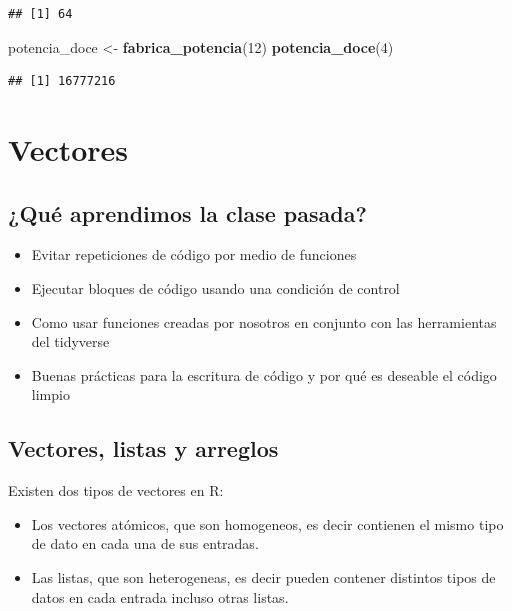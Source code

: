 \documentclass[]{book}
\newenvironment{Shaded}{\begin{snugshade}}{\end{snugshade}}
\newcommand{\KeywordTok}[1]{\textcolor[rgb]{0.13,0.29,0.53}{\textbf{#1}}}
\newcommand{\DecValTok}[1]{\textcolor[rgb]{0.00,0.00,0.81}{#1}}
\newcommand{\StringTok}[1]{\textcolor[rgb]{0.31,0.60,0.02}{#1}}
\newcommand{\NormalTok}[1]{#1}
\providecommand{\tightlist}{%
  \setlength{\itemsep}{0pt}\setlength{\parskip}{0pt}}
\theoremstyle{definition}
\theoremstyle{definition}
\theoremstyle{definition}
\theoremstyle{remark}
\begin{document}
\begin{verbatim}
## [1] 64
\end{verbatim}

\begin{Shaded}
\begin{Highlighting}[]
\NormalTok{potencia_doce <-}\StringTok{ }\KeywordTok{fabrica_potencia}\NormalTok{(}\DecValTok{12}\NormalTok{)}
\KeywordTok{potencia_doce}\NormalTok{(}\DecValTok{4}\NormalTok{)}
\end{Highlighting}
\end{Shaded}

\begin{verbatim}
## [1] 16777216
\end{verbatim}

\chapter{Vectores}\label{vectores}

\section{¿Qué aprendimos la clase
pasada?}\label{que-aprendimos-la-clase-pasada-3}

\begin{itemize}
\tightlist
\item
  Evitar repeticiones de código por medio de funciones
\item
  Ejecutar bloques de código usando una condición de control
\item
  Como usar funciones creadas por nosotros en conjunto con las
  herramientas del tidyverse
\item
  Buenas prácticas para la escritura de código y por qué es deseable el
  código limpio
\end{itemize}

\section{Vectores, listas y arreglos}\label{vectores-listas-y-arreglos}

Existen dos tipos de vectores en R:

\begin{itemize}
\tightlist
\item
  Los vectores atómicos, que son homogeneos, es decir contienen el mismo
  tipo de dato en cada una de sus entradas.
\item
  Las listas, que son heterogeneas, es decir pueden contener distintos
  tipos de datos en cada entrada incluso otras listas.
\end{itemize}
\end{document}
